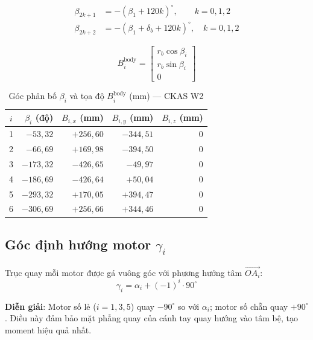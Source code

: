 \documentclass[12pt,a4paper]{article}
\begin{document}
\begin{align}
  \beta_{2k+1} &= -(\beta_1 + 120k)^{\circ}, \qquad k = 0{,}1{,}2 \label{eq:beta_odd}\\
  \beta_{2k+2} &= -(\beta_1 + \delta_b + 120k)^{\circ}, \quad k = 0{,}1{,}2 \label{eq:beta_even}
\end{align}

\begin{equation}
  B_i^{\text{body}} = \begin{bmatrix} r_b\cos\beta_i \\ r_b\sin\beta_i \\ 0 \end{bmatrix}
  \label{eq:Bi}
\end{equation}

\begin{table}[H]\centering
\caption{Góc phân bố $\beta_i$ và tọa độ $B_i^{\text{body}}$ (mm) --- CKAS W2}
\label{tab:Bi}
\begin{tabular}{@{}c r r r r@{}}
\toprule
$i$ & $\beta_i$ (độ) & $B_{i,x}$ (mm) & $B_{i,y}$ (mm) & $B_{i,z}$ (mm) \\
\midrule
1 & $-53{,}32$   & $+256{,}60$ & $-344{,}51$ & $0$ \\
2 & $-66{,}69$   & $+169{,}98$ & $-394{,}50$ & $0$ \\
3 & $-173{,}32$  & $-426{,}65$ & $-49{,}97$  & $0$ \\
4 & $-186{,}69$  & $-426{,}64$ & $+50{,}04$  & $0$ \\
5 & $-293{,}32$  & $+170{,}05$ & $+394{,}47$ & $0$ \\
6 & $-306{,}69$  & $+256{,}66$ & $+344{,}46$ & $0$ \\
\bottomrule
\end{tabular}
\end{table}

\subsection{Góc định hướng motor $\gamma_i$}

Trục quay mỗi motor được gá vuông góc với phương hướng tâm $\overrightarrow{OA_i}$:
\begin{equation}
  \gamma_i = \alpha_i + (-1)^i \cdot 90^{\circ}
  \label{eq:gamma}
\end{equation}

\textbf{Diễn giải}: Motor số lẻ ($i=1{,}3{,}5$) quay $-90^{\circ}$ so với $\alpha_i$; motor số
chẵn quay $+90^{\circ}$. Điều này đảm bảo mặt phẳng quay của cánh tay quay hướng vào tâm
bệ, tạo moment hiệu quả nhất.
\end{document}
